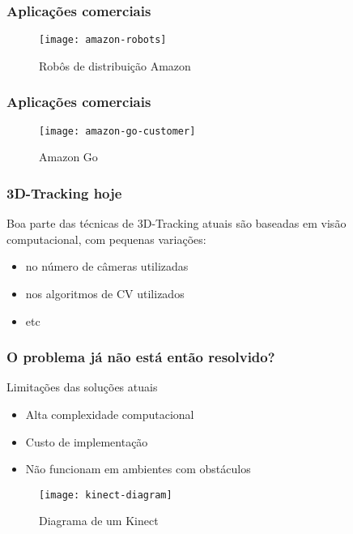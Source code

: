 \begin{frame}
  \frametitle{Aplicações comerciais}
					\begin{figure}
							\texttt{[image: amazon-robots]}
						\captionsetup{labelformat=empty}
						\caption{Robôs de distribuição Amazon}
					\end{figure}
\end{frame}

\begin{frame}
  \frametitle{Aplicações comerciais}
					\begin{figure}
							\texttt{[image: amazon-go-customer]}
						\captionsetup{labelformat=empty}
						\caption{Amazon Go}
					\end{figure}
\end{frame}

\begin{frame}
  \frametitle{3D-Tracking hoje}

  Boa parte das técnicas de 3D-Tracking atuais são baseadas em visão computacional, com pequenas variações:
  \begin{itemize}
    \item no número de câmeras utilizadas
    \item nos algoritmos de CV utilizados
    \item etc
  \end{itemize}
\end{frame}

\begin{frame}
  \frametitle{O problema já não está então resolvido?}

  Limitações das soluções atuais
  \begin{itemize}
    \item  Alta complexidade computacional
    \item  Custo de implementação
    \item  Não funcionam em ambientes com obstáculos
  \end{itemize}

	\begin{figure}
			\texttt{[image: kinect-diagram]}
		\captionsetup{labelformat=empty}
		\caption{Diagrama de um Kinect}
	\end{figure}
\end{frame}


